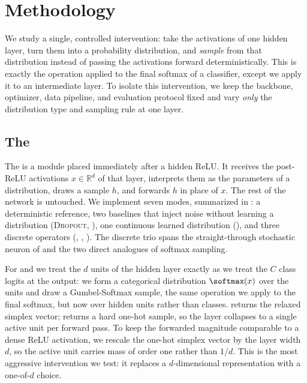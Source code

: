 \section{Methodology}\label{sec:method}

We study a single, controlled intervention: take the activations of one hidden layer, turn them into a probability distribution, and \emph{sample} from that distribution instead of passing the activations forward deterministically. This is exactly the operation applied to the final softmax of a classifier, except we apply it to an intermediate layer. To isolate this intervention, we keep the backbone, optimizer, data pipeline, and evaluation protocol fixed and vary \emph{only} the distribution type and sampling rule at one layer.

\subsection{The \samplinglayer}\label{sec:method:layer}

 The \samplinglayer is a module placed immediately after a hidden ReLU. It receives the post-ReLU activations $x \in \mathbb{R}^d$ of that layer, interprets them as the parameters of a distribution, draws a sample $h$, and forwards $h$ in place of $x$. The rest of the network is untouched. We implement seven modes, summarized in : a deterministic reference, two baselines that inject noise without learning a distribution (\textsc{Dropout}, \gaussnoise), one continuous learned distribution (\gaussreparam), and three discrete operators (\bernoullist, \gumbelsoft, \gumbelst). The discrete trio spans the straight-through stochastic neuron of \citet{bengio2013stochastic} and the two direct analogues of softmax sampling.

 For \gumbelsoft and \gumbelst we treat the $d$ units of the hidden layer exactly as we treat the $C$ class logits at the output: we form a categorical distribution $\softmax(x)$ over the units and draw a Gumbel-Softmax sample, the same operation we apply to the final softmax, but now over hidden units rather than classes. \gumbelsoft returns the relaxed simplex vector; \gumbelst returns a hard one-hot sample, so the layer collapses to a single active unit per forward pass. To keep the forwarded magnitude comparable to a dense ReLU activation, we rescale the one-hot simplex vector by the layer width $d$, so the active unit carries mass of order one rather than $1/d$. This is the most aggressive intervention we test: it replaces a $d$-dimensional representation with a one-of-$d$ choice.

